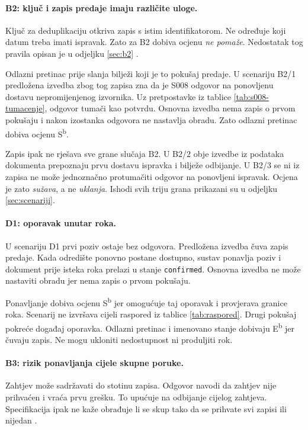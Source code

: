 \paragraph{B2: ključ i zapis predaje imaju različite uloge.}
Ključ za deduplikaciju otkriva zapis s istim identifikatorom. Ne određuje
koji datum treba imati ispravak. Zato za B2 dobiva ocjenu \emph{ne pomaže}.
Nedostatak tog pravila opisan je u odjeljku \ref{sec:b2}
\cite{pu2026hrcius,pu2026tehspec}.

Odlazni pretinac prije slanja bilježi koji je to pokušaj predaje. U scenariju
B2/1 predložena izvedba zbog tog zapisa zna da je S008 odgovor na ponovljenu
dostavu nepromijenjenog izvornika. Uz pretpostavke iz tablice
\ref{tab:s008-tumacenje}, odgovor tumači kao potvrdu. Osnovna izvedba nema
zapis o prvom pokušaju i nakon izostanka odgovora ne nastavlja obradu. Zato
odlazni pretinac dobiva ocjenu S\textsuperscript{b}.

Zapis ipak ne rješava sve grane slučaja B2. U B2/2 obje izvedbe iz podataka
dokumenta prepoznaju prvu dostavu ispravka i bilježe odbijanje. U B2/3 se ni
iz zapisa ne može jednoznačno protumačiti odgovor na ponovljeni ispravak.
Ocjena je zato \emph{sužava}, a ne \emph{uklanja}. Ishodi svih triju grana
prikazani su u odjeljku \ref{sec:scenariji}.

\paragraph{D1: oporavak unutar roka.}
U scenariju D1 prvi poziv ostaje bez odgovora. Predložena izvedba čuva zapis
predaje. Kada odredište ponovno postane dostupno, sustav ponavlja poziv i
dokument prije isteka roka prelazi u stanje \texttt{confirmed}. Osnovna
izvedba ne može nastaviti obradu jer nema zapis o prvom pokušaju.

Ponavljanje dobiva ocjenu S\textsuperscript{b} jer omogućuje taj oporavak i
provjerava granice roka. Scenarij ne izvršava cijeli raspored iz tablice
\ref{tab:raspored}. Drugi pokušaj pokreće događaj oporavka. Odlazni pretinac
i imenovano stanje dobivaju E\textsuperscript{b} jer čuvaju zapis. Ne mogu
ukloniti nedostupnost ni produljiti rok.

\paragraph{B3: rizik ponavljanja cijele skupne poruke.}
Zahtjev može sadržavati do stotinu zapisa. Odgovor navodi da zahtjev nije
prihvaćen i vraća prvu grešku. To upućuje na odbijanje cijelog zahtjeva.
Specifikacija ipak ne kaže obrađuje li se skup tako da se prihvate svi
zapisi ili nijedan \cite{pu2026tehspec}.

